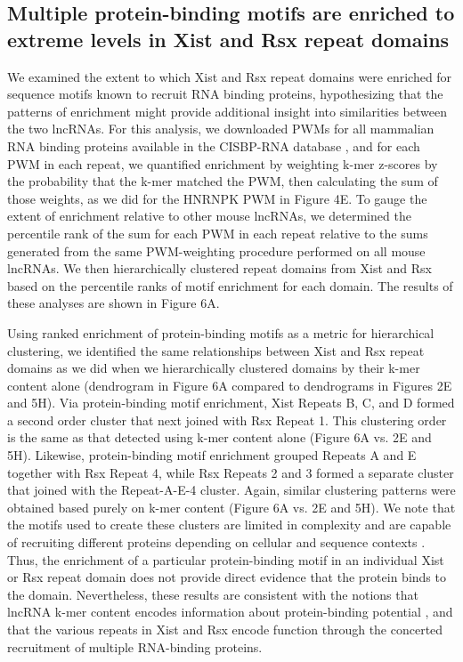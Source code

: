 \subsection{Multiple protein-binding motifs are enriched to extreme levels in Xist and Rsx repeat domains}
We examined the extent to which Xist and Rsx repeat domains were enriched for sequence motifs known to recruit RNA binding proteins, hypothesizing that the patterns of enrichment might provide additional insight into similarities between the two lncRNAs. For this analysis, we downloaded PWMs for all mammalian RNA binding proteins available in the CISBP-RNA database \cite{Ray2013ARegulation}, and for each PWM in each repeat, we quantified enrichment by weighting k-mer z-scores by the probability that the k-mer matched the PWM, then calculating the sum of those weights, as we did for the HNRNPK PWM in Figure 4E. To gauge the extent of enrichment relative to other mouse lncRNAs, we determined the percentile rank of the sum for each PWM in each repeat relative to the sums generated from the same PWM-weighting procedure performed on all mouse lncRNAs. We then hierarchically clustered repeat domains from Xist and Rsx based on the percentile ranks of motif enrichment for each domain. The results of these analyses are shown in Figure 6A.

Using ranked enrichment of protein-binding motifs as a metric for hierarchical clustering, we  identified the same relationships between Xist and Rsx repeat domains as we did when we hierarchically clustered domains by their k-mer content alone (dendrogram in Figure 6A compared to dendrograms in Figures 2E and 5H). Via protein-binding motif enrichment, Xist Repeats B, C, and D formed a second order cluster that next joined with Rsx Repeat 1.  This clustering order is the same as that detected using k-mer content alone (Figure 6A vs. 2E and 5H). Likewise, protein-binding motif enrichment grouped Repeats A and E together with Rsx Repeat 4, while Rsx Repeats 2 and 3 formed a separate cluster that joined with the Repeat-A-E-4 cluster. Again, similar clustering patterns were obtained based purely on k-mer content (Figure 6A vs. 2E and 5H). We note that the motifs used to create these clusters are limited in complexity and are capable of recruiting different proteins depending on cellular and sequence contexts \cite{Dominguez2018SequenceProteins,Ray2013ARegulation}. Thus, the enrichment of a particular protein-binding motif in an individual Xist or Rsx repeat domain does not provide direct evidence that the protein binds to the domain. Nevertheless, these results are consistent with the notions that lncRNA k-mer content encodes information about protein-binding potential \cite{Kirk2018FunctionalContent}, and that the various repeats in Xist and Rsx encode function through the concerted recruitment of multiple RNA-binding proteins.

